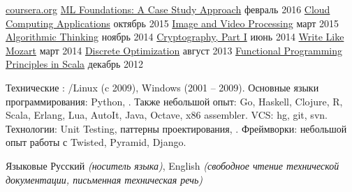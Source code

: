 \documentclass[unicode, 10pt, a4paper, oneside, fleqn]{article}
\begin{document}
\begin{minipage}[t]{0.50\textwidth}
\setlength\abovedisplayskip{0pt}
\courseplatform
    {\href{http://www.coursera.org}{coursera.org}}
    {}
    {
        \course
            {\href{}
                  {ML Foundations: A Case Study Approach}}
            {февраль 2016}
            {}
        \course
            {\href{}
                  {Cloud Computing Applications}}
            {октябрь 2015}
            {}
        \course
            {\href{https://drive.google.com/file/d/0B2cptPgckn74MGQ5SUVQRGVDNE0/view}
                  {Image and Video Processing}}
            {март 2015}
            {}
        \course
            {\href{https://drive.google.com/file/d/0B2cptPgckn74ZkIwTWNFYUx6STA/view?usp=sharing}
                  {Algorithmic Thinking}}
            {ноябрь 2014}
            {}
        \course
            {\href{https://drive.google.com/file/d/0B2cptPgckn74OWlrVEZlR3U3azQ/edit?usp=sharing}
                  {Cryptography, Part I}}
            {июнь 2014}
            {}
        \course
            {\href{https://drive.google.com/file/d/0B2cptPgckn74WHJkQkNTdnN4dVU/edit?usp=sharing}
                  {Write Like Mozart}}
            {март 2014}
            {}
        \course
            {\href{https://docs.google.com/file/d/0B2cptPgckn74ZnN0Znhnd3ZUejg/edit?usp=sharing}
                  {Discrete Optimization}}
            {август 2013}
            {}
        \course
            {\href{https://docs.google.com/document/d/1AWaukQ0K4C-ZcuRRqYANJuYDOPxYH7MoVdXYKHPYJ8I/edit}
                  {Functional Programming Principles in Scala}}
            {декабрь 2012}
            {}
    }
\end{minipage}




\inlineheadsection  %
    {Технические}
    {
        : /Linux (c 2009), Windows (2001 -- 2009).
        Основные языки программирования: Python, .
        Также небольшой опыт: Go, Haskell, Clojure, R, Scala, Erlang, Lua,
        AutoIt, Java, Octave, x86 assembler.
        VCS: hg, git, svn.
        Технологии: Unit Testing, паттерны проектирования, .
        Фреймворки: небольшой опыт работы с Twisted, Pyramid, Django.
    }

\inlineheadsection
    {Языковые}
    {
        Русский \emph{(носитель языка)}, English \emph{(свободное чтение
        технической документации, письменная техническая речь)}
    }

\end{document}

